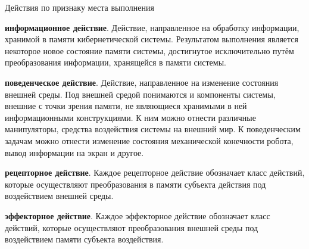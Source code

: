 \begin{frame}{Действия по признаку места выполнения}
    \begin{textitemize}
        \item \textbf{информационное действие}. Действие, направленное на обработку информации, хранимой в памяти кибернетической системы. Результатом выполнения является некоторое новое состояние памяти системы, достигнутое исключительно путём преобразования информации, хранящейся в памяти системы.
        \item \textbf{поведенческое действие}. Действие, направленное на изменение состояния внешней среды. Под внешней средой понимаются и компоненты системы, внешние с точки зрения памяти, не являющиеся хранимыми в ней информационными конструкциями. К ним можно отнести различные манипуляторы, средства воздействия системы на внешний мир. К поведенческим задачам можно отнести изменение состояния механической конечности робота, вывод информации на экран и другое.
    \end{textitemize}
\end{frame}
\begin{frame}{}
\begin{textitemize}
    \item \textbf{рецепторное действие}. Каждое рецепторное действие обозначает класс действий, которые осуществляют преобразования в памяти субъекта действия под воздействием внешней среды.
        \item \textbf{эффекторное действие}. Каждое эффекторное действие обозначает класс действий, которые осуществляют преобразования внешней среды под воздействием памяти субъекта воздействия.
\end{textitemize}
\end{frame}


